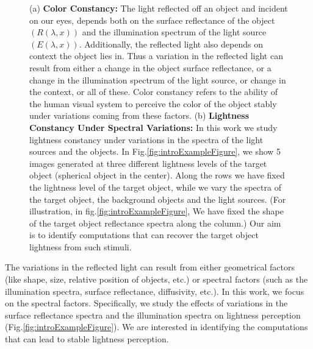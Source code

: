\documentclass{jov}
\begin{document}
\begin{figure}[h]
    \caption{(a) {\bf Color Constancy:} The light reflected off an object and incident on our eyes, depends both on the surface reflectance of the object $\left( R(\lambda,x) \right)$ and the illumination spectrum of the light source $\left(E(\lambda,x)\right)$. Additionally, the reflected light also depends on context the object lies in. Thus a variation in the reflected light can result from either a change in the object surface reflectance, or a change in the illumination spectrum of the light source, or change in the context, or all of these. Color constancy refers to the ability of the human visual system to perceive the color of the object stably under variations coming from these factors. (b) {\bf Lightness Constancy Under Spectral Variations:} In this work we study lightness constancy under variations in the spectra of the light sources and the objects. In Fig.\ref{fig:introExampleFigure}, we show 5 images generated at three different lightness levels of the target object (spherical object in the center). Along the rows we have fixed the lightness level of the target object, while we vary the spectra of the target object, the background objects and the light sources. (For illustration, in fig.\ref{fig:introExampleFigure}, We have fixed the shape of the target object reflectance spectra along the column.) Our aim is to identify computations that can recover the target object lightness from such stimuli.} 
\end{figure}

The variations in the reflected light can result from either geometrical factors (like shape, size, relative position of objects, etc.) or spectral factors (such as the illumination spectra, surface reflectance, diffusivity, etc.). In this work, we focus on the spectral factors. Specifically, we study the effects of variations in the surface reflectance spectra and the illumination spectra on lightness perception  (Fig.\ref{fig:introExampleFigure}). We are interested in identifying the computations that can lead to stable lightness perception.
\end{document}
